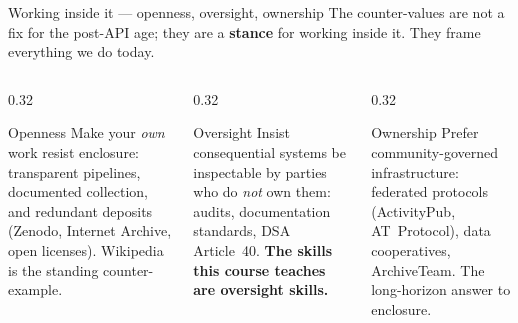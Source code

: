 \documentclass[9pt,aspectratio=169]{beamer}
\begin{document}
\begin{frame}{Working inside it --- openness, oversight, ownership}
    The counter-values are not a fix for the post-API age; they are a \textbf{stance} for working inside it. They frame everything we do today.
    \begin{columns}[T]
        \begin{column}{0.32\textwidth}
            \begin{block}{Openness}
                \footnotesize Make your \textit{own} work resist enclosure: transparent pipelines, documented collection, and redundant deposits (Zenodo, Internet Archive, open licenses). Wikipedia is the standing counter-example.
            \end{block}
        \end{column}
        \begin{column}{0.32\textwidth}
            \begin{block}{Oversight}
                \footnotesize Insist consequential systems be inspectable by parties who do \textit{not} own them: audits, documentation standards, DSA Article~40. \textbf{The skills this course teaches are oversight skills.}
            \end{block}
        \end{column}
        \begin{column}{0.32\textwidth}
            \begin{block}{Ownership}
                \footnotesize Prefer community-governed infrastructure: federated protocols (ActivityPub, AT~Protocol), data cooperatives, ArchiveTeam. The long-horizon answer to enclosure.
            \end{block}
        \end{column}
    \end{columns}
    \vspace{0.4em}
\end{frame}
\end{document}
